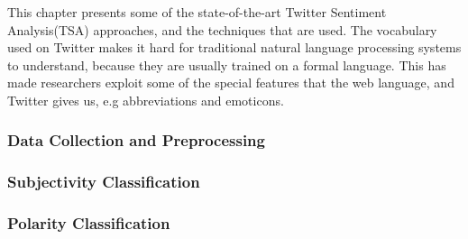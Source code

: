 This chapter presents some of the state-of-the-art Twitter Sentiment Analysis(TSA) approaches, and the techniques that are used. The vocabulary used on Twitter makes it hard for traditional natural language processing systems to understand, because they are usually trained on a formal language. This has made researchers exploit some of the special features that the web language, and Twitter gives us, e.g abbreviations and emoticons.
	
		\subsubsection{Data Collection and Preprocessing}
		
		
		\subsubsection{Subjectivity Classification}
		
		
		\subsubsection{Polarity Classification}
		
